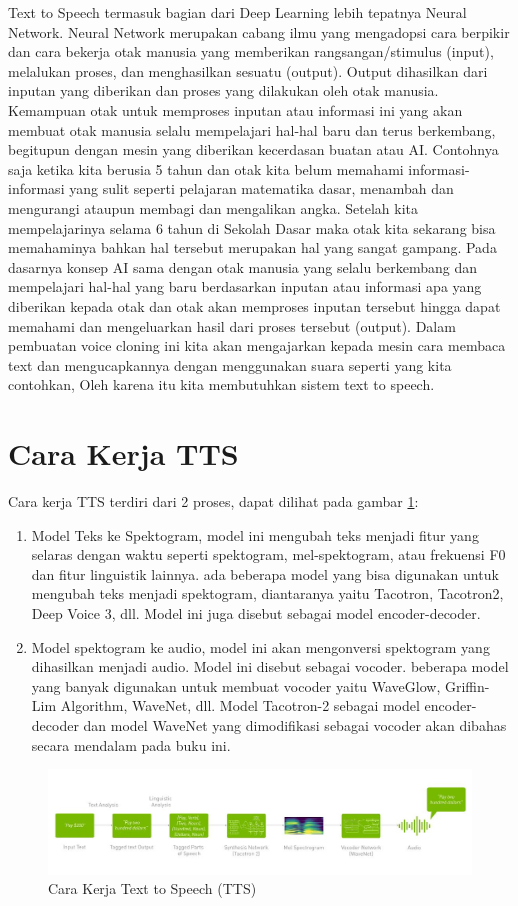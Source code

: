 Text to Speech termasuk bagian dari Deep Learning lebih tepatnya Neural Network. Neural Network merupakan cabang ilmu yang mengadopsi cara berpikir dan cara bekerja otak manusia yang memberikan rangsangan/stimulus (input), melalukan proses, dan menghasilkan sesuatu (output). Output dihasilkan dari inputan yang diberikan dan proses yang dilakukan oleh otak manusia. Kemampuan otak untuk memproses inputan atau informasi ini yang akan membuat otak manusia selalu mempelajari hal-hal baru dan terus berkembang, begitupun dengan mesin yang diberikan kecerdasan buatan atau AI. Contohnya saja ketika kita berusia 5 tahun dan otak kita belum memahami informasi-informasi yang sulit seperti pelajaran matematika dasar, menambah dan mengurangi ataupun membagi dan mengalikan angka. Setelah kita mempelajarinya selama 6 tahun di Sekolah Dasar maka otak kita sekarang bisa memahaminya bahkan hal tersebut merupakan hal yang sangat gampang. Pada dasarnya konsep AI sama dengan otak manusia yang selalu berkembang dan mempelajari hal-hal yang baru berdasarkan inputan atau informasi apa yang diberikan kepada otak dan otak akan memproses inputan tersebut hingga dapat memahami dan mengeluarkan hasil dari proses tersebut (output).
Dalam pembuatan voice cloning ini kita akan mengajarkan kepada mesin cara membaca text dan mengucapkannya dengan menggunakan suara seperti yang kita contohkan, Oleh karena itu kita membutuhkan sistem text to speech.


\section{Cara Kerja TTS}
Cara kerja TTS terdiri dari 2 proses, dapat dilihat pada gambar \ref{cara kerja}:
\begin{enumerate}
\item Model Teks ke Spektogram, model ini mengubah teks menjadi fitur yang selaras dengan waktu seperti spektogram, mel-spektogram, atau frekuensi F0 dan fitur linguistik lainnya. ada beberapa model yang bisa digunakan untuk mengubah teks menjadi spektogram, diantaranya yaitu Tacotron, Tacotron2, Deep Voice 3, dll. Model ini juga disebut sebagai model encoder-decoder.
\item Model spektogram ke audio, model ini akan mengonversi spektogram yang dihasilkan menjadi audio. Model ini disebut sebagai vocoder. beberapa model yang banyak digunakan untuk membuat vocoder yaitu WaveGlow, Griffin-Lim Algorithm, WaveNet, dll.
Model Tacotron-2 sebagai model encoder-decoder dan model WaveNet yang dimodifikasi sebagai vocoder akan dibahas secara mendalam pada buku ini.
\end{enumerate}
\begin{figure}[!htbp]
        \centerline{\includegraphics[scale=.40]{figures/cara_kerja_tts}}
        \caption{Cara Kerja Text to Speech (TTS)}
		\label{cara kerja}
\end{figure}
